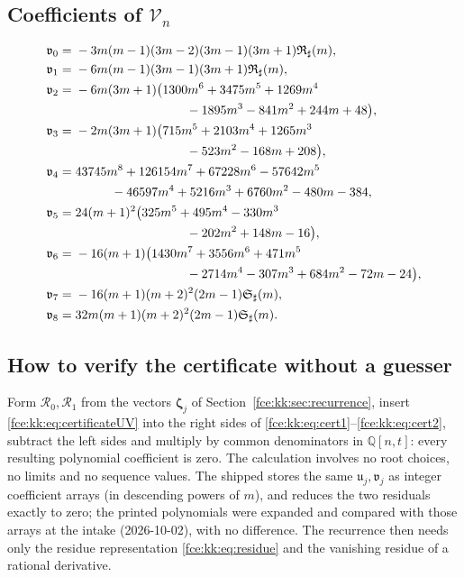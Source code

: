 \documentclass[11pt,a4paper]{article}
\numberwithin{equation}{section}
\theoremstyle{definition}\newtheorem{definition}[theorem]{Definition}
\theoremstyle{remark}\newtheorem{remark}[theorem]{Remark}
\newcommand{\Q}{\mathbb Q}
\begin{document}
\subsection{Coefficients of \texorpdfstring{$\mathscr V_n$}{V-n}}
\begin{align*}
\mathfrak v_0={}&-3m(m-1)(3m-2)(3m-1)(3m+1)\mathfrak R_\sharp(m),\\
\mathfrak v_1={}&-6m(m-1)(3m-1)(3m+1)\mathfrak R_\sharp(m),\\
\mathfrak v_2={}&-6m(3m+1)\bigl(1300m^6+3475m^5+1269m^4\\
 &\hspace{31mm}-1895m^3-841m^2+244m+48\bigr),\\
\mathfrak v_3={}&-2m(3m+1)\bigl(715m^5+2103m^4+1265m^3\\
 &\hspace{31mm}-523m^2-168m+208\bigr),\\
\mathfrak v_4={}&43745m^8+126154m^7+67228m^6-57642m^5\\
 &\hspace{10mm}-46597m^4+5216m^3+6760m^2-480m-384,\\
\mathfrak v_5={}&24(m+1)^2\bigl(325m^5+495m^4-330m^3\\
 &\hspace{31mm}-202m^2+148m-16\bigr),\\
\mathfrak v_6={}&-16(m+1)\bigl(1430m^7+3556m^6+471m^5\\
 &\hspace{31mm}-2714m^4-307m^3+684m^2-72m-24\bigr),\\
\mathfrak v_7={}&-16(m+1)(m+2)^2(2m-1)\mathfrak S_\sharp(m),\\
\mathfrak v_8={}&32m(m+1)(m+2)^2(2m-1)\mathfrak S_\sharp(m).
\end{align*}

\subsection{How to verify the certificate without a guesser}
Form $\mathscr R_0,\mathscr R_1$ from the vectors $\boldsymbol\zeta_j$ of
Section~\ref{fce:kk:sec:recurrence}, insert \eqref{fce:kk:eq:certificateUV}
into the right sides of \eqref{fce:kk:eq:cert1}--\eqref{fce:kk:eq:cert2},
subtract the left sides and multiply by common denominators in
$\Q[n,t]$: every resulting polynomial coefficient is zero. The calculation
involves no root choices, no limits and no sequence values. The shipped
 stores the same
$\mathfrak u_j,\mathfrak v_j$ as integer coefficient arrays (in descending
powers of $m$), and  reduces the two
residuals exactly to zero; the printed polynomials were expanded and
compared with those arrays at the intake (2026-10-02), with no difference.
The recurrence then needs only the residue representation
\eqref{fce:kk:eq:residue} and the vanishing residue of a rational
derivative.
\end{document}
